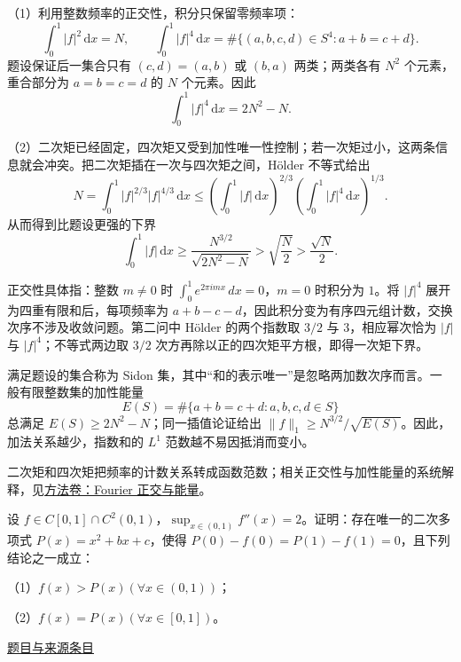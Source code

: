 \documentclass[UTF8,12pt,a4paper,fontset=fandol]{ctexart}
\begin{document}
\begin{solve}\label{ans:ch01-17th-A:2}

（1）利用整数频率的正交性，积分只保留零频率项：
\[
\int_0^1|f|^2\,\mathrm dx=N,\qquad
\int_0^1|f|^4\,\mathrm dx
=\#\{(a,b,c,d)\in S^4:a+b=c+d\}.
\]
题设保证后一集合只有 $(c,d)=(a,b)$ 或 $(b,a)$ 两类；两类各有 $N^2$ 个元素，重合部分为 $a=b=c=d$ 的 $N$ 个元素。因此
\[
\int_0^1|f|^4\,\mathrm dx=2N^2-N.
\]

（2）二次矩已经固定，四次矩又受到加性唯一性控制；若一次矩过小，这两条信息就会冲突。把二次矩插在一次与四次矩之间，Hölder 不等式给出
\[
N=\int_0^1 |f|^{2/3}|f|^{4/3}\,\mathrm dx
\leq\left(\int_0^1|f|\,\mathrm dx\right)^{2/3}
     \left(\int_0^1|f|^4\,\mathrm dx\right)^{1/3}.
\]
从而得到比题设更强的下界
\[
\int_0^1|f|\,\mathrm dx
\geq\frac{N^{3/2}}{\sqrt{2N^2-N}}
>\sqrt{\frac N2}>\frac{\sqrt N}{2}.
\]

正交性具体指：整数 $m\ne0$ 时 $\int_0^1e^{2\pi imx}\,dx=0$，$m=0$ 时积分为 $1$。将 $|f|^4$ 展开为四重有限和后，每项频率为 $a+b-c-d$，因此积分变为有序四元组计数，交换次序不涉及收敛问题。第二问中 Hölder 的两个指数取 $3/2$ 与 $3$，相应幂次恰为 $|f|$ 与 $|f|^4$；不等式两边取 $3/2$ 次方再除以正的四次矩平方根，即得一次矩下界。

\end{solve}

\begin{remark}[方法与条件]满足题设的集合称为 Sidon 集，其中“和的表示唯一”是忽略两加数次序而言。一般有限整数集的加性能量
\[
E(S)=\#\{a+b=c+d:a,b,c,d\in S\}
\]
总满足 $E(S)\geq2N^2-N$；同一插值论证给出 $\|f\|_1\geq N^{3/2}/\sqrt{E(S)}$。因此，加法关系越少，指数和的 $L^1$ 范数越不易因抵消而变小。

二次矩和四次矩把频率的计数关系转成函数范数；相关正交性与加性能量的系统解释，见\hyperref[app:integration-fourier]{方法卷：Fourier 正交与能量}。\end{remark}

\begin{example}[来源序号5]\label{ex:ch01-17th-A:5}\label{pr:ch01-17th-A:5}

设 $f \in C[0,1] \cap C^2(0,1)$，$\sup_{x \in (0,1)} f''(x) = 2$。证明：存在唯一的二次多项式 $P(x) = x^2 + bx + c$，使得 $P(0) - f(0) = P(1) - f(1) = 0$，且下列结论之一成立：

（1）$f(x) > P(x) (\forall x \in (0,1))$；

（2）$f(x) = P(x) (\forall x \in [0,1])$。

\par\href{https://github.com/lzxcr/cmc-mathematics/blob/64916fa1fdbc3e444a652eca204d5669058ee321/src/problems/preliminary/17/05.md}{题目与来源条目}

\end{example}
\end{document}
